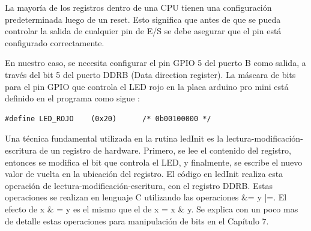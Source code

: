 \documentclass[12pt]{article}
\begin{document}

La mayoría de los registros dentro de una CPU tienen una configuración
predeterminada luego de un reset.
Esto significa que antes de que se pueda controlar la salida de cualquier
pin de E/S se debe asegurar que el pin está configurado correctamente.


En nuestro caso, se necesita configurar el pin GPIO 5 del puerto B como 
salida, a través del bit 5 del puerto DDRB (Data direction register).
La máscara de bits para el pin GPIO que controla el LED rojo en la
placa arduino pro mini está definido en el programa como sigue :

\begin{verbatim}
#define LED_ROJO	(0x20)		/* 0b00100000 */
\end{verbatim}

Una técnica fundamental utilizada en la rutina ledInit es la lectura-modificación-escritura de un registro de hardware.
Primero, se lee el contenido del registro, entonces se modifica el bit que controla el LED, y finalmente, se escribe el nuevo valor de vuelta en la ubicación
del registro.
El código en ledInit realiza esta operación de lectura-modificación-escritura,
con el registro DDRB. Estas operaciones se realizan en lenguaje C utilizando
las operaciones \&= y |=. El efecto de x \& = y es el mismo que el de
x = x \& y. Se explica con un poco mas de detalle estas operaciones para manipulación
de bits en el Capítulo 7.
\end{document}
